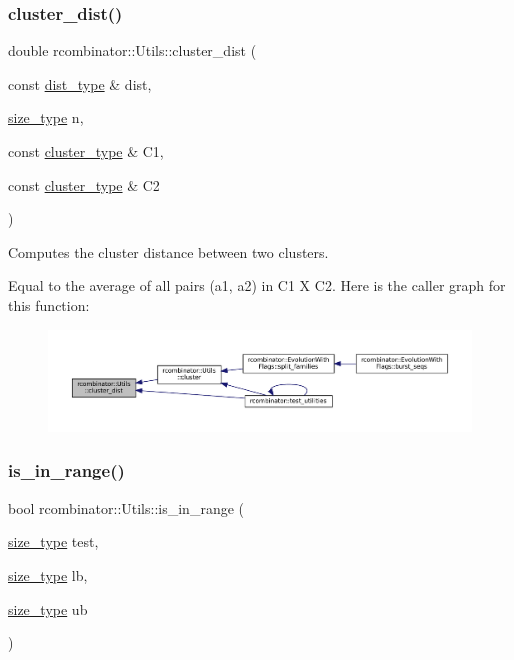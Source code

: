 \subsubsection{\texorpdfstring{cluster\+\_\+dist()}{cluster\_dist()}}
{\footnotesize\ttfamily double rcombinator\+::\+Utils\+::cluster\+\_\+dist (\begin{DoxyParamCaption}\item[{const \mbox{\hyperlink{constants_8h_a0d6ecb761af58b56a675077153fa9ba9}{dist\+\_\+type}} \&}]{dist,  }\item[{\mbox{\hyperlink{constants_8h_abcd18a5521fc90ff6e7b00e4fee98397}{size\+\_\+type}}}]{n,  }\item[{const \mbox{\hyperlink{constants_8h_aa5d5324de5e3188e825da6a7a40df01d}{cluster\+\_\+type}} \&}]{C1,  }\item[{const \mbox{\hyperlink{constants_8h_aa5d5324de5e3188e825da6a7a40df01d}{cluster\+\_\+type}} \&}]{C2 }\end{DoxyParamCaption})}



Computes the cluster distance between two clusters. 

Equal to the average of all pairs (a1, a2) in C1 X C2. Here is the caller graph for this function\+:
\nopagebreak
\begin{figure}[H]
\begin{center}
\leavevmode
\includegraphics[width=350pt]{namespacercombinator_1_1Utils_a948886c343b7c56fae8e1921dfa5114a_icgraph}
\end{center}
\end{figure}
\mbox{\label{namespacercombinator_1_1Utils_a2693553db4ed242f1488e6c9fd491692}} 
\subsubsection{\texorpdfstring{is\+\_\+in\+\_\+range()}{is\_in\_range()}}
{\footnotesize\ttfamily bool rcombinator\+::\+Utils\+::is\+\_\+in\+\_\+range (\begin{DoxyParamCaption}\item[{\mbox{\hyperlink{constants_8h_abcd18a5521fc90ff6e7b00e4fee98397}{size\+\_\+type}}}]{test,  }\item[{\mbox{\hyperlink{constants_8h_abcd18a5521fc90ff6e7b00e4fee98397}{size\+\_\+type}}}]{lb,  }\item[{\mbox{\hyperlink{constants_8h_abcd18a5521fc90ff6e7b00e4fee98397}{size\+\_\+type}}}]{ub }\end{DoxyParamCaption})\hspace{0.3cm}{\ttfamily [inline]}}



